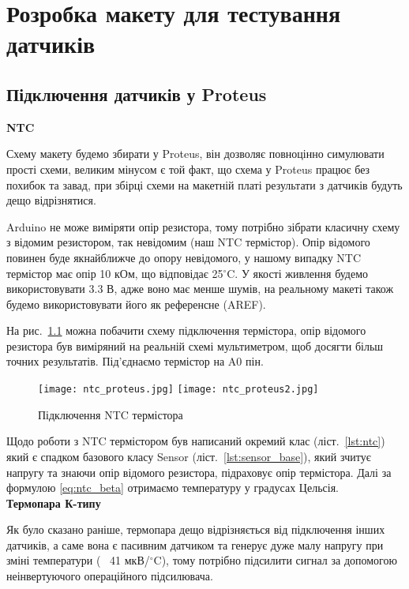 \chapter{Розробка макету для тестування датчиків}
\thispagestyle{headings}

\section{Підключення датчиків у Proteus}

\textbf{NTC}\bigskip

Схему макету будемо збирати у Proteus, він дозволяє повноцінно симулювати прості схеми, великим мінусом є той факт, що схема у Proteus працює без похибок та завад, при збірці схеми на макетній платі результати з датчиків будуть дещо відрізнятися.

Arduino не може виміряти опір резистора, тому потрібно зібрати класичну схему з відомим резистором, так невідомим (наш NTC термістор). Опір відомого повинен буде якнайближче до опору невідомого, у нашому випадку NTC термістор має опір 10 кОм, що відповідає 25$^\circ$C. У якості живлення будемо використовувати 3.3 В, адже воно має менше шумів, на реальному макеті також будемо використовувати його як референсне (AREF).

На рис.~\ref{fig:ntc_proteus} можна побачити схему підключення термістора, опір відомого резистора був виміряний на реальній схемі мультиметром, щоб досягти більш точних результатів. Під'єднаємо термістор на A0 пін.

\begin{figure}[ht]
    \centering
    \texttt{[image: ntc\_proteus.jpg]}
    \texttt{[image: ntc\_proteus2.jpg]}
    \caption{Підключення NTC термістора}
    \label{fig:ntc_proteus}
\end{figure}

Щодо роботи з NTC термістором був написаний окремий клас (ліст.~\ref{lst:ntc}) який є спадком базового класу Sensor (ліст.~\ref{lst:sensor_base}), який зчитує напругу та знаючи опір відомого резистора, підраховує опір термістора. Далі за формулою \ref{eq:ntc_beta} отримаємо температуру у градусах Цельсія.\\

\textbf{Термопара К-типу}\bigskip

Як було сказано раніше, термопара дещо відрізняється від підключення інших датчиків, а саме вона є пасивним датчиком та генерує дуже малу напругу при зміні температури (~ 41 мкВ/$^\circ$C), тому потрібно підсилити сигнал за допомогою неінвертуючого операційного підсилювача.

